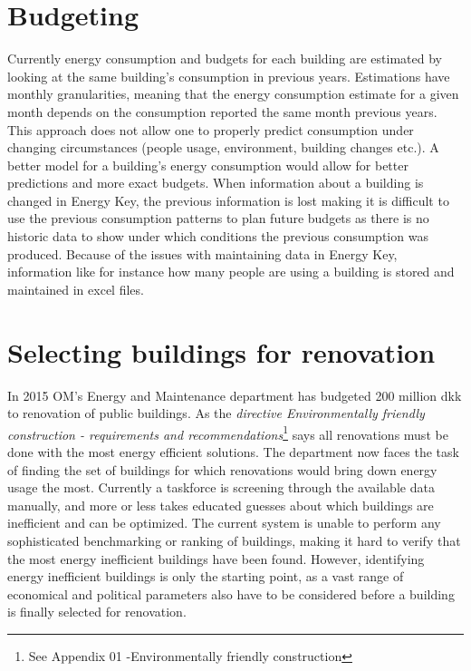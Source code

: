  \section*{Budgeting}
 Currently energy consumption and budgets for each building are estimated by looking at the same building’s consumption in previous years. Estimations have monthly granularities, meaning that the energy consumption estimate for a given month depends on the consumption reported the same month previous years. This approach does not allow one to properly predict consumption under changing circumstances (people usage, environment, building changes etc.). A better model for a building’s energy consumption would allow for better predictions and more exact budgets. When information about a building is changed in Energy Key, the previous information is lost making it is difficult to use the previous consumption patterns to plan future budgets as there is no historic data to show under which conditions the previous consumption was produced. Because of the issues with maintaining data in Energy Key, information like for instance how many people are using a building is stored and maintained in excel files.
 \section*{Selecting buildings for renovation}
 In 2015 OM’s Energy and Maintenance department has budgeted 200 million dkk to renovation of public buildings. As the \emph{directive Environmentally friendly construction - requirements and recommendations}\footnote{See Appendix 01 -Environmentally friendly construction} says all renovations must be done with the most energy efficient solutions. The department now faces the task of finding the set of buildings for which renovations would bring down energy usage the most. Currently a taskforce is screening through the available data manually, and more or less takes educated guesses about which buildings are inefficient and can be optimized. The current system is unable to perform any sophisticated benchmarking or ranking of buildings, making it hard to verify that the most energy inefficient buildings have been found. However, identifying energy inefficient buildings is only the starting point, as a vast range of economical and political parameters also have to be considered before a building is finally selected for renovation.